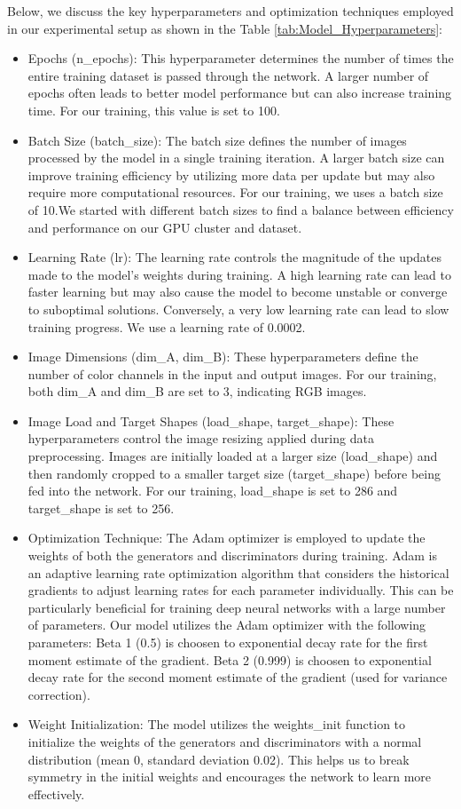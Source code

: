 \documentclass[UKenglish,12pt]{master-style}
\begin{document}
Below, we discuss the key hyperparameters and optimization techniques employed in our experimental setup as shown in the Table \ref{tab:Model_Hyperparameters}: 
\begin{itemize}
\item Epochs (n\_epochs): This hyperparameter determines the number of times the entire training dataset is passed through the network. A larger number of epochs often leads to better model performance but can also increase training time. For our training, this value is set to 100.
\item Batch Size (batch\_size): The batch size defines the number of images processed by the model in a single training iteration. A larger batch size can improve training efficiency by utilizing more data per update but may also require more computational resources. For our training, we uses a batch size of 10.We started with different batch sizes to find a balance between efficiency and performance on our GPU cluster and dataset.
\item Learning Rate (lr): The learning rate controls the magnitude of the updates made to the model's weights during training. A high learning rate can lead to faster learning but may also cause the model to become unstable or converge to suboptimal solutions. Conversely, a very low learning rate can lead to slow training progress. We use a learning rate of 0.0002. 
\item Image Dimensions (dim\_A, dim\_B): These hyperparameters define the number of color channels in the input and output images. For our training, both dim\_A and dim\_B are set to 3, indicating RGB images.
\item Image Load and Target Shapes (load\_shape, target\_shape): These hyperparameters control the image resizing applied during data preprocessing. Images are initially loaded at a larger size (load\_shape) and then randomly cropped to a smaller target size (target\_shape) before being fed into the network. For our training, load\_shape is set to 286 and target\_shape is set to 256.
\item Optimization Technique: The Adam optimizer is employed to update the weights of both the generators and discriminators during training. Adam is an adaptive learning rate optimization algorithm that considers the historical gradients to adjust learning rates for each parameter individually. This can be particularly beneficial for training deep neural networks with a large number of parameters.
Our model utilizes the Adam optimizer with the following parameters: Beta 1 (0.5) is choosen to exponential decay rate for the first moment estimate of the gradient. Beta 2 (0.999) is choosen to exponential decay rate for the second moment estimate of the gradient (used for variance correction).
\item Weight Initialization: The model utilizes the weights\_init function to initialize the weights of the generators and discriminators with a normal distribution (mean 0, standard deviation 0.02). This helps us to break symmetry in the initial weights and encourages the network to learn more effectively.
\end{itemize}
\end{document}
